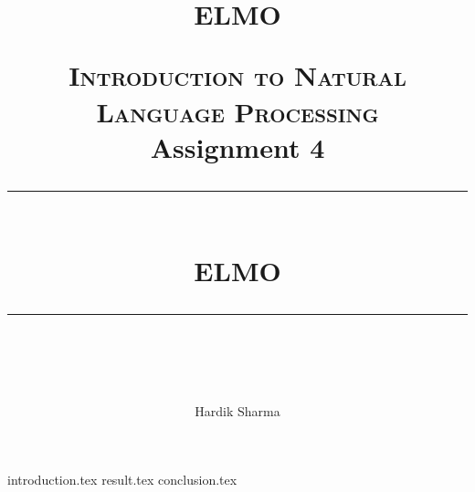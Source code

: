 \documentclass[a4paper,9pt]{report}
\title{ELMO}
\newcommand{\HRule}[1]{\rule{\linewidth}{#1}}
\begin{document}
\title{ \normalsize \textsc{\LARGE Introduction to Natural Language Processing}
		\\ [2.0cm]
        \LARGE Assignment 4 
		\HRule{0.5pt} \\
		\LARGE \textbf{\uppercase{ELMO}}
		\HRule{2pt} \\ [0.5cm]
		\normalsize \vspace*{3\baselineskip}}
        \date{ }

\author{Hardik Sharma}

\maketitle

{introduction.tex}
{result.tex}
{conclusion.tex}
\end{document}
